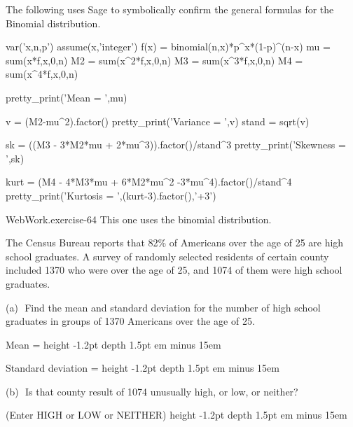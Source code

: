 \documentclass[10pt,]{book}
\newcommand{\fillin}[1]{\leavevmode\leaders\vrule height -1.2pt depth 1.5pt \hskip #1em minus #1em \null}
\numberwithin{equation}{section}
\begin{document}
%
\par
\hypertarget{p-926}{}%
The following uses Sage to symbolically confirm the general formulas for the Binomial distribution.%
\par
\hypertarget{p-927}{}%
\leavevmode%
\begin{sageinput}
var('x,n,p')
assume(x,'integer')
f(x) = binomial(n,x)*p^x*(1-p)^(n-x)
mu = sum(x*f,x,0,n)
M2 = sum(x^2*f,x,0,n)
M3 = sum(x^3*f,x,0,n)
M4 = sum(x^4*f,x,0,n)

pretty_print('Mean = ',mu)

v = (M2-mu^2).factor()
pretty_print('Variance = ',v)
stand = sqrt(v)

sk = ((M3 - 3*M2*mu + 2*mu^3)).factor()/stand^3
pretty_print('Skewness = ',sk)

kurt = (M4 - 4*M3*mu + 6*M2*mu^2 -3*mu^4).factor()/stand^4
pretty_print('Kurtosis = ',(kurt-3).factor(),'+3')
\end{sageinput}
%
\par
\hypertarget{p-928}{}%
\begin{inlineexercise}{WebWork.}{exercise-64}%
\hypertarget{p-929}{}%
This one uses the binomial distribution.%
\par\medskip
\hypertarget{p-930}{}%
The Census Bureau reports that 82\% of Americans over the age of 25 are high school graduates. A survey of randomly selected residents of certain county included 1370 who were over the age of 25, and 1074 of them were high school graduates.%
\par
\hypertarget{p-931}{}%
(a) \(\) Find the mean and standard deviation for the number of high school graduates in groups of 1370 Americans over the age of 25.%
\par
\hypertarget{p-932}{}%
Mean =  \fillin{15}%
\par
\hypertarget{p-933}{}%
Standard deviation =  \fillin{15}%
\par
\hypertarget{p-934}{}%
(b) \(\) Is that county result of 1074 unusually high, or low, or neither?%
\par
\hypertarget{p-935}{}%
(Enter HIGH or LOW or NEITHER)  \fillin{15}%
\end{inlineexercise}
%
\par
\hypertarget{p-936}{}%
\leavevmode%
\end{document}
